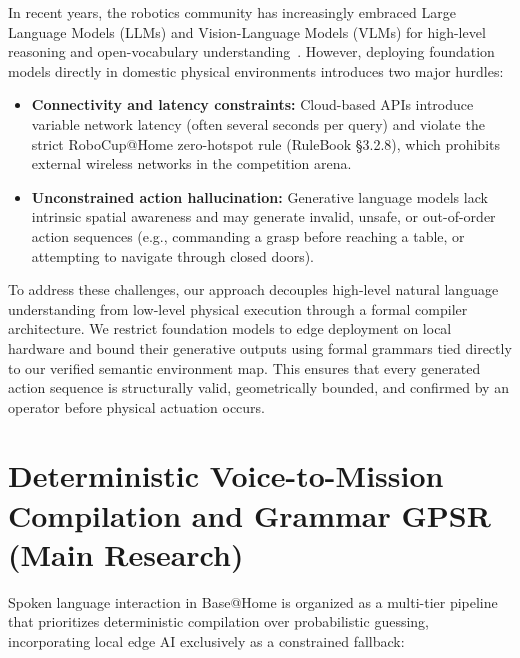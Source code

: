 \documentclass[runningheads,a4paper]{llncs}
\begin{document}
In recent years, the robotics community has increasingly embraced Large Language Models (LLMs) and Vision-Language Models (VLMs) for high-level reasoning and open-vocabulary understanding~\cite{memmesheimer2024nimbro,roborregos_frida_cortex}. However, deploying foundation models directly in domestic physical environments introduces two major hurdles:
\begin{itemize}
    \item \textbf{Connectivity and latency constraints:} Cloud-based APIs introduce variable network latency (often several seconds per query) and violate the strict RoboCup@Home zero-hotspot rule (RuleBook \S 3.2.8), which prohibits external wireless networks in the competition arena.
    \item \textbf{Unconstrained action hallucination:} Generative language models lack intrinsic spatial awareness and may generate invalid, unsafe, or out-of-order action sequences (e.g., commanding a grasp before reaching a table, or attempting to navigate through closed doors).
\end{itemize}

To address these challenges, our approach decouples high-level natural language understanding from low-level physical execution through a formal compiler architecture. We restrict foundation models to edge deployment on local hardware and bound their generative outputs using formal grammars tied directly to our verified semantic environment map. This ensures that every generated action sequence is structurally valid, geometrically bounded, and confirmed by an operator before physical actuation occurs.

\section{Deterministic Voice-to-Mission Compilation and Grammar GPSR (Main Research)}
\label{sec:compiler}
Spoken language interaction in Base@Home is organized as a multi-tier pipeline that prioritizes deterministic compilation over probabilistic guessing, incorporating local edge AI exclusively as a constrained fallback:
\end{document}
